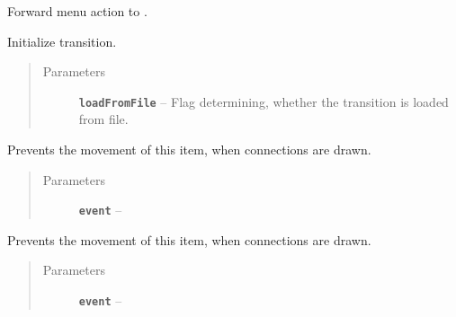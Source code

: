 \documentclass[a4paper,10pt,english]{sphinxmanual}
\begin{document}
\begin{fulllineitems}
\begin{fulllineitems}
\label{model_link:model.TransitionItem.TransitionItem.importSubnet}
Forward menu action  to .

\end{fulllineitems}


\begin{fulllineitems}
\label{model_link:model.TransitionItem.TransitionItem.initTransition}
Initialize transition.
\begin{quote}\begin{description}
\item[{Parameters}] \leavevmode
\textbf{\texttt{loadFromFile}} -- Flag determining, whether the transition is loaded from file.

\end{description}\end{quote}

\end{fulllineitems}


\begin{fulllineitems}
\label{model_link:model.TransitionItem.TransitionItem.mouseMoveEvent}
Prevents the movement of this item, when connections are drawn.
\begin{quote}\begin{description}
\item[{Parameters}] \leavevmode
\textbf{\texttt{event}} -- 

\end{description}\end{quote}

\end{fulllineitems}


\begin{fulllineitems}
\label{model_link:model.TransitionItem.TransitionItem.mousePressEvent}
Prevents the movement of this item, when connections are drawn.
\begin{quote}\begin{description}
\item[{Parameters}] \leavevmode
\textbf{\texttt{event}} -- 


\end{description}
\end{quote}
\end{fulllineitems}
\end{fulllineitems}
\end{document}
